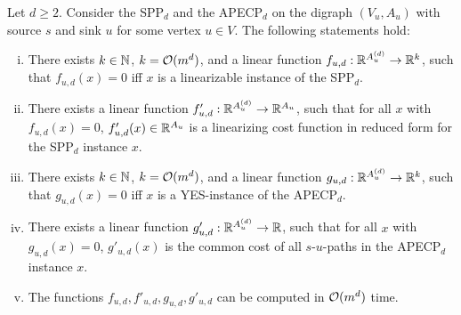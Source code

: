 \begin{lemma}
\label{lemma:subspaces-induction}
    Let $d \geq 2$. Consider the SPP$_d$ and the APECP$_{d}$ on the digraph $(V_u, A_u)$ with source $s$ and sink $u$  for some vertex $u\in V$. The following statements  hold:
    \begin{enumerate}[(i)]
        \item There exists $k \in \mathbb{N}$, $k = \mathcal{O}(m^{d})$,  and a linear function $f_{u,d} : \mathbb{R}^{A_u^{(d)}} \rightarrow \mathbb{R}^k$, such that  $f_{u,d}(x) = 0$ iff $x$ is a linearizable instance of the SPP$_{d}$.
        \item There exists a linear function $f'_{u,d} : \mathbb{R}^{A_u^{(d)}} \rightarrow \mathbb{R}^{A_u}$, such that for all $x$ with $f_{u,d}(x) = 0$,   $f'_{u,d}(x) \in \mathbb{R}^{A_u}$ is a linearizing cost function in reduced form for the SPP$_d$ instance $x$.
        \item There exists $k \in \mathbb{N}$, $k = \mathcal{O}(m^{d})$,  and a linear function $g_{u,d} : \mathbb{R}^{A_u^{(d)}} \rightarrow \mathbb{R}^k$, such that   $g_{u,d}(x) = 0$ iff $x$ is a YES-instance of the APECP$_{d}$.
        \item There exists a linear function $g'_{u,d} : \mathbb{R}^{A_u^{(d)}} \rightarrow \mathbb{R}$, such that for all $x$ with $g_{u,d}(x) = 0$, $g'_{u,d}(x)$ is the common cost of all $s$-$u$-paths in the APECP$_{d}$ instance $x$.
        \item The functions $f_{u,d}, f'_{u,d}, g_{u,d}, g'_{u,d}$ can be computed in $\mathcal{O}(m^d)$ time.
    \end{enumerate}
\end{lemma}
